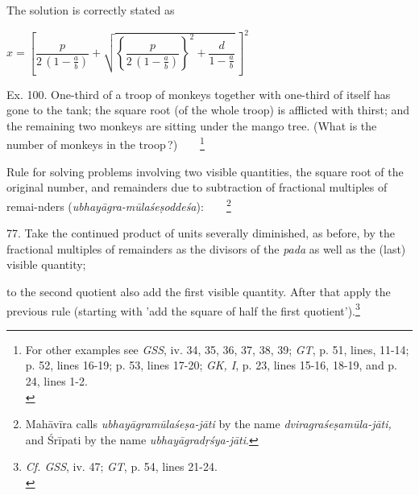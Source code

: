 \documentclass[10pt, openany]{book}
\begin{document}
{{{{{{{{{{{{{{{{{{{{\begin{sloppypar}
{The solution is correctly stated as

\begin{center} $x= \left[\dfrac{p}{2\,\left(1 - \frac{a}{b}\right)} + \sqrt{\left\lbrace\dfrac{p}{2\,\left(1 - \frac{a}{b}\right)}\right\rbrace^2 + \dfrac{d}{1-\frac{a}{b}}}\,\right]^ 2$
\end{center}}
\vspace{1mm}

 Ex. 100. One-third of a troop of monkeys together
with one-third of itself has gone to the tank; the square root (of the whole troop) is afflicted with thirst; and the remaining two monkeys are sitting under the mango tree. (What is
the number of monkeys in the troop\,?)~~~~\renewcommand{\thefootnote}{\hspace{-4.5mm} 3}\footnote{\hspace{-2mm} \en For other examples see \textit{GSS}, iv. 34, 35, 36, 37, 38, 39; \textit{GT}, p.
51, lines, 11-14; p. 52, lines 16-19; p. 53, lines 17-20; \textit{GK, I}, p. 23,
lines 15-16, 18-19, and p. 24, lines 1-2.\\}
\vspace{4mm}

\noindent Rule for solving problems involving two visible quantities,
the square root of the original number, and remainders due
to subtraction of fractional multiples of remai-nders (\textit{ubhayāgra-mūlaśeṣoddeśa}):~~~~\renewcommand{\thefootnote}{\hspace{-4.5mm} 4}\footnote{\hspace{-2mm} \en Mahāvīra calls  \textit{ubhayāgramūlaśeṣa-jāti}
by the name  \textit{dviragraśeṣamūla-jāti,} and Śrīpati by the name \textit{ubhayāgradṛśya-jāti}.}
\vspace{3mm}

 77. Take the continued product of units severally
diminished, as before, by the fractional multiples of remainders as the divisors of the  \textit{pada} as well as the (last) visible
quantity;

\end{sloppypar}

\newpage

\noindent to the second quotient also add the first visible
quantity. After that apply the previous rule (starting with
'add the square of half the first quotient').\renewcommand{\thefootnote}{1}\footnote{\hspace{-2mm} \en \textit{Cf. GSS}, iv. 47; \textit{GT}, p. 54, lines 21-24.\\}
\vspace{3mm}

}}}}}}}}}}}}}}}}}}}}
\end{document}
